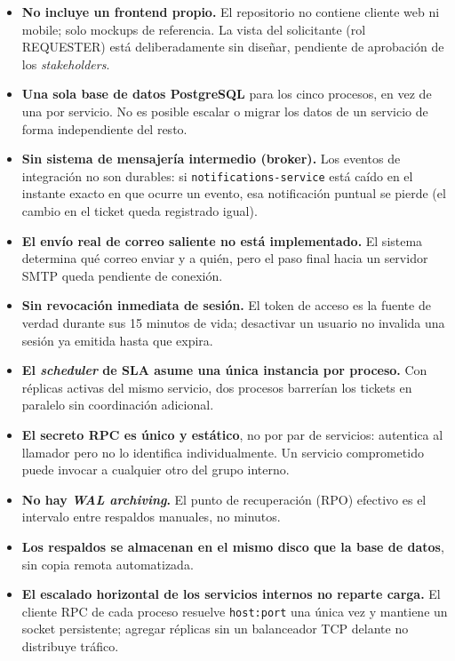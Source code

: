 \documentclass[11pt,a4paper]{article}
\begin{document}
\begin{itemize}[leftmargin=1.2cm]
  \item \textbf{No incluye un frontend propio.} El repositorio no contiene
    cliente web ni mobile; solo mockups de referencia. La vista del
    solicitante (rol REQUESTER) está deliberadamente sin diseñar, pendiente
    de aprobación de los \emph{stakeholders}.
  \item \textbf{Una sola base de datos PostgreSQL} para los cinco procesos,
    en vez de una por servicio. No es posible escalar o migrar los datos de
    un servicio de forma independiente del resto.
  \item \textbf{Sin sistema de mensajería intermedio (broker).} Los eventos
    de integración no son durables: si \texttt{notifications-service} está
    caído en el instante exacto en que ocurre un evento, esa notificación
    puntual se pierde (el cambio en el ticket queda registrado igual).
  \item \textbf{El envío real de correo saliente no está implementado.} El
    sistema determina qué correo enviar y a quién, pero el paso final hacia
    un servidor SMTP queda pendiente de conexión.
  \item \textbf{Sin revocación inmediata de sesión.} El token de acceso es
    la fuente de verdad durante sus 15 minutos de vida; desactivar un
    usuario no invalida una sesión ya emitida hasta que expira.
  \item \textbf{El \emph{scheduler} de SLA asume una única instancia por
    proceso.} Con réplicas activas del mismo servicio, dos procesos
    barrerían los tickets en paralelo sin coordinación adicional.
  \item \textbf{El secreto RPC es único y estático}, no por par de
    servicios: autentica al llamador pero no lo identifica individualmente.
    Un servicio comprometido puede invocar a cualquier otro del grupo
    interno.
  \item \textbf{No hay \emph{WAL archiving}.} El punto de recuperación
    (RPO) efectivo es el intervalo entre respaldos manuales, no minutos.
  \item \textbf{Los respaldos se almacenan en el mismo disco que la base de
    datos}, sin copia remota automatizada.
  \item \textbf{El escalado horizontal de los servicios internos no reparte
    carga.} El cliente RPC de cada proceso resuelve \texttt{host:port} una
    única vez y mantiene un socket persistente; agregar réplicas sin un
    balanceador TCP delante no distribuye tráfico.

\end{itemize}
\end{document}
